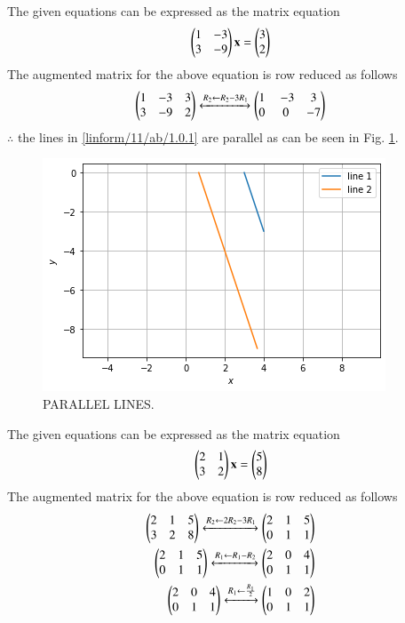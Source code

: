 \item
The given equations can be expressed as the matrix equation
\begin{align}
\begin{pmatrix}1 & -3\\3 & -9\end{pmatrix} \mathbf{x} = \begin{pmatrix}3\\2\end{pmatrix}
\end{align}
%
The augmented matrix for the above equation is row reduced as follows
\begin{align}
\begin{pmatrix}1 & -3 & 3\\3 & -9 & 2\end{pmatrix} 
\xleftrightarrow {R_2\leftarrow R_2 -3R_1}\begin{pmatrix}1 & \ -3 & 3 \\0 & 0 & -7 \end{pmatrix}
\end{align}
%
$\therefore$ the lines in \eqref{linform/11/ab/1.0.1} are parallel as can be seen in Fig. \ref{linform/11/ab/figure: parallel lines.}.
%
\begin{figure}[ht!]
\centering
\includegraphics[width=\columnwidth]{solutions/su2021/2/11/ab/Parallel_ lines (1).png}
\caption{PARALLEL LINES.}
\label{linform/11/ab/figure: parallel lines.}
\end{figure}
\item
The given  equations can be expressed as the matrix equation
\begin{align}
\begin{pmatrix}2 & 1\\3 & 2\end{pmatrix}
\mathbf{x} = \begin{pmatrix}5\\8\end{pmatrix}
\end{align}
%
The augmented matrix for the above equation is row reduced as follows
\begin{align}
\begin{pmatrix}2 & 1 & 5\\3 & 2 & 8 \end{pmatrix}
\xleftrightarrow {R_2\leftarrow 2R_2-3R_1}\begin{pmatrix}2 & 1 &5 \\0 & 1 & 1\end{pmatrix}
\\
\begin{pmatrix}2 & 1 & 5\\0 & 1 & 1\end{pmatrix}
\xleftrightarrow {R_1\leftarrow
R_1-R_2}\begin{pmatrix}2 & 0 & 4\\0 & 1 & 1\end{pmatrix}
\\
\begin{pmatrix}2 & 0 & 4\\0 & 1 & 1\end{pmatrix}
\xleftrightarrow{R_1\leftarrow \frac{R_1}{2}}\begin{pmatrix}1 & 0 & 2\\0 & 1 & 1\end{pmatrix}
\end{align}
